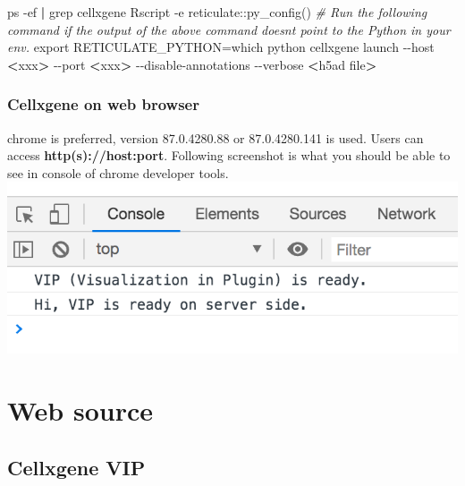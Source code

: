 \documentclass[
]{article}
\newenvironment{Shaded}{\begin{snugshade}}{\end{snugshade}}
\newcommand{\AttributeTok}[1]{\textcolor[rgb]{0.77,0.63,0.00}{#1}}
\newcommand{\BuiltInTok}[1]{#1}
\newcommand{\CommentTok}[1]{\textcolor[rgb]{0.56,0.35,0.01}{\textit{#1}}}
\newcommand{\ExtensionTok}[1]{#1}
\newcommand{\FunctionTok}[1]{\textcolor[rgb]{0.00,0.00,0.00}{#1}}
\newcommand{\KeywordTok}[1]{\textcolor[rgb]{0.13,0.29,0.53}{\textbf{#1}}}
\newcommand{\NormalTok}[1]{#1}
\newcommand{\OperatorTok}[1]{\textcolor[rgb]{0.81,0.36,0.00}{\textbf{#1}}}
\newcommand{\StringTok}[1]{\textcolor[rgb]{0.31,0.60,0.02}{#1}}
\newcommand{\VariableTok}[1]{\textcolor[rgb]{0.00,0.00,0.00}{#1}}
\begin{document}
\begin{Shaded}
\begin{Highlighting}[]
\FunctionTok{ps} \AttributeTok{{-}ef} \KeywordTok{|} \FunctionTok{grep}\NormalTok{ cellxgene}
\ExtensionTok{Rscript} \AttributeTok{{-}e} \StringTok{\textquotesingle{}reticulate::py\_config()\textquotesingle{}}
\CommentTok{\# Run the following command if the output of the above command doesn\textquotesingle{}t point to the Python in your env.}
\BuiltInTok{export} \VariableTok{RETICULATE\_PYTHON=}\KeywordTok{\textasciigrave{}}\FunctionTok{which}\NormalTok{ python}\KeywordTok{\textasciigrave{}}
\ExtensionTok{cellxgene}\NormalTok{ launch }\AttributeTok{{-}{-}host} \OperatorTok{\textless{}}\NormalTok{xxx}\OperatorTok{\textgreater{}}\NormalTok{ {-}{-}port }\OperatorTok{\textless{}}\NormalTok{xxx}\OperatorTok{\textgreater{}}\NormalTok{ {-}{-}disable{-}annotations }\AttributeTok{{-}{-}verbose} \OperatorTok{\textless{}}\NormalTok{h5ad file}\OperatorTok{\textgreater{}}
\end{Highlighting}
\end{Shaded}

\hypertarget{cellxgene-on-web-browser}{%
\subsubsection{Cellxgene on web browser}\label{cellxgene-on-web-browser}}

chrome is preferred, version 87.0.4280.88 or 87.0.4280.141 is used. Users can access \textbf{http(s)://host:port}.
Following screenshot is what you should be able to see in console of chrome developer tools.
\includegraphics{cellonweb.png}

\hypertarget{web-source}{%
\section{Web source}\label{web-source}}

\hypertarget{cellxgene-vip}{%
\subsection*{Cellxgene VIP}\label{cellxgene-vip}}
\end{document}
